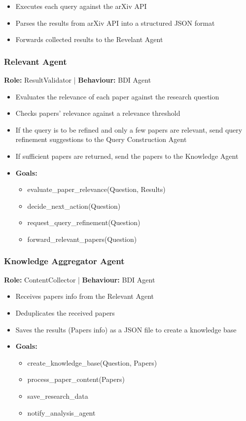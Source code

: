 \documentclass{article}
\begin{document}
\begin{itemize}
  \item Executes each query against the arXiv API
  \item Parses the results from arXiv API into a structured JSON format
  \item Forwards collected results to the Revelant Agent
\end{itemize}

\subsubsection{Relevant Agent}

\textbf{Role:} ResultValidator | \textbf{Behaviour:} BDI Agent

\begin{itemize}
  \item Evaluates the relevance of each paper against the research question
  \item Checks papers' relevance against a relevance threshold
  \item If the query is to be refined and only a few papers are relevant, send query refinement suggestions to the Query Construction Agent
  \item If sufficient papers are returned, send the papers to the Knowledge Agent
  \item \textbf{Goals:} \begin{itemize} 
    \item evaluate\_paper\_relevance(Question, Results)
    \item decide\_next\_action(Question)
    \item request\_query\_refinement(Question)
    \item forward\_relevant\_papers(Question)
  \end{itemize}
\end{itemize}

\subsubsection{Knowledge Aggregator Agent}

\textbf{Role:} ContentCollector | \textbf{Behaviour:} BDI Agent

\begin{itemize}
  \item Receives papers info from the Relevant Agent
  \item Deduplicates the received papers
  \item Saves the results (Papers info) as a JSON file to create a knowledge base
  \item \textbf{Goals:} \begin{itemize} 
    \item create\_knowledge\_base(Question, Papers)
    \item process\_paper\_content(Papers)
    \item save\_research\_data
    \item notify\_analysis\_agent
  \end{itemize}
\end{itemize}
\end{document}
